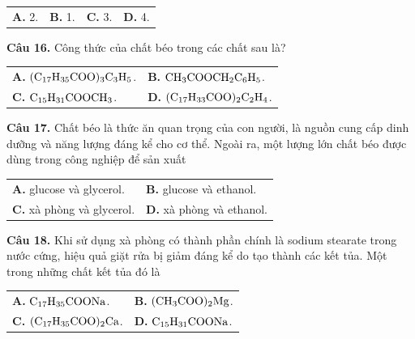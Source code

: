 \documentclass{article}
\begin{document}
\begin{tabularx}{\linewidth}{@{}X X X X@{}}
\textbf{A.} 2. & \textbf{B.} 1. & \textbf{C.} 3. & \textbf{D.} 4.
\end{tabularx}
\vspace*{\fill}
\newpage

\fontsize{29}{38}\selectfont
\textbf{Câu 16.} Công thức của chất béo trong các chất sau là?
\vspace{6pt}

\begin{tabularx}{\linewidth}{@{}X X@{}}
\textbf{A.} $(\ce{C17H35COO})_3\ce{C3H5}$. & \textbf{B.} $\ce{CH3COOCH2C6H5}$.\\[6pt]
\textbf{C.} $\ce{C15H31COOCH3}$. & \textbf{D.} $(\ce{C17H33COO})_2\ce{C2H4}$.
\end{tabularx}

\vspace*{\fill}

\textbf{Câu 17.} Chất béo là thức ăn quan trọng của con người, là nguồn cung cấp dinh dưỡng và năng lượng đáng kể cho cơ thể. Ngoài ra, một lượng lớn chất béo được dùng trong công nghiệp để sản xuất
\vspace{6pt}

\begin{tabularx}{\linewidth}{@{}X X@{}}
\textbf{A.} glucose và glycerol. & \textbf{B.} glucose và ethanol.\\[6pt]
\textbf{C.} xà phòng và glycerol. & \textbf{D.} xà phòng và ethanol.
\end{tabularx}
\vspace*{\fill}
\newpage

\fontsize{29}{39}\selectfont
\textbf{Câu 18.} Khi sử dụng xà phòng có thành phần chính là sodium stearate trong nước cứng, hiệu quả giặt rửa bị giảm đáng kể do tạo thành các kết tủa. Một trong những chất kết tủa đó là
\vspace{16pt}

\begin{tabularx}{\linewidth}{@{}X X@{}}
\textbf{A.} $\ce{C17H35COONa}$. & \textbf{B.} $(\ce{CH3COO})_2\ce{Mg}$.\\[16pt]
\textbf{C.} $(\ce{C17H35COO})_2\ce{Ca}$. & \textbf{D.} $\ce{C15H31COONa}$.
\end{tabularx}
\vspace*{\fill}
\newpage

\end{document}
